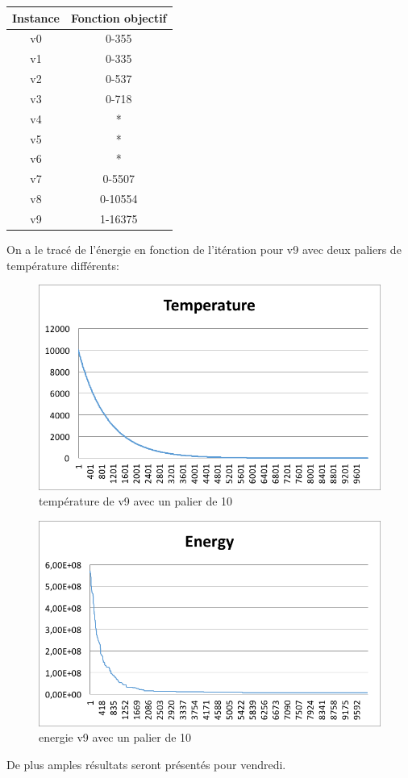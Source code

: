 \documentclass[a4paper, 11pt]{article} %
\begin{document}
\begin{center}
\begin{tabular}{|c|c|}
 \hline 
 Instance & Fonction objectif \\ \hline
 v0 &  0-355\\ \hline
 v1 &  0-335\\ \hline
 v2 &  0-537\\ \hline
 v3 &  0-718\\ \hline
 v4 &  *\\ \hline
 v5 &  *\\ \hline
 v6 &  *\\ \hline
 v7 &  0-5507\\ \hline
 v8 &  0-10554\\ \hline
 v9 &  1-16375\\ \hline


\end{tabular}
\end{center}

On a le tracé de l'énergie en fonction de l'itération pour v9 avec deux paliers de température différents:
\begin{center}

\begin{figure}
\caption{température de v9 avec un palier de 10}
\includegraphics{v9-p10-it10000-temp.png}
\end{figure}

\begin{figure}
\caption{energie v9 avec un palier de 10}
\includegraphics{v9-p10-it10000-energy.png}
\end{figure}

\end{center}

De plus amples résultats seront présentés pour vendredi.
\end{document}
